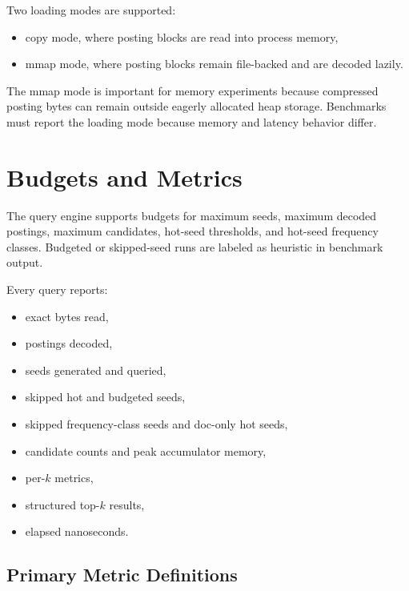 \documentclass[11pt]{article}
\begin{document}
Two loading modes are supported:
\begin{itemize}
  \item copy mode, where posting blocks are read into process memory,
  \item mmap mode, where posting blocks remain file-backed and are decoded lazily.
\end{itemize}

The mmap mode is important for memory experiments because compressed posting bytes can remain outside eagerly allocated heap storage. Benchmarks must report the loading mode because memory and latency behavior differ.

\section{Budgets and Metrics}

The query engine supports budgets for maximum seeds, maximum decoded postings, maximum candidates, hot-seed thresholds, and hot-seed frequency classes. Budgeted or skipped-seed runs are labeled as heuristic in benchmark output.

Every query reports:
\begin{itemize}
  \item exact bytes read,
  \item postings decoded,
  \item seeds generated and queried,
  \item skipped hot and budgeted seeds,
  \item skipped frequency-class seeds and doc-only hot seeds,
  \item candidate counts and peak accumulator memory,
  \item per-\(k\) metrics,
  \item structured top-\(k\) results,
  \item elapsed nanoseconds.
\end{itemize}

\subsection{Primary Metric Definitions}
\end{document}
